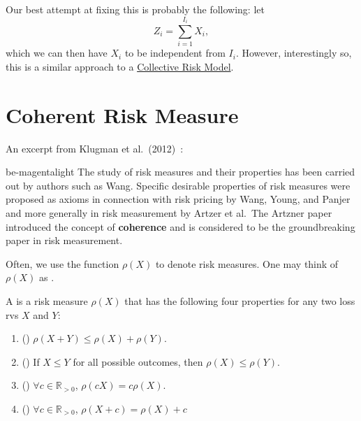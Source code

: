 \documentclass[notoc,notitlepage]{tufte-book}
\begin{document}
Our best attempt at fixing this is probably the following: let
\begin{equation*}
  Z_i = \sum_{i=1}^{I_i} X_i,
\end{equation*}
which we can then have $X_i$ to be independent from $I_i$. However, interestingly so, this is a similar approach to a \hyperref[defn:collective_risk_model]{Collective Risk Model}.


\section{Coherent Risk Measure}%
\label{sec:coherent_risk_measure}

An excerpt from Klugman et al.\ (2012)~\cite{KlugmanPanjerWillmot2012}:

\begin{quotebox}{be-magenta}{light}
  The study of risk measures and their properties has been carried out by authors such as Wang. Specific desirable properties of risk measures were proposed as axioms in connection with risk pricing by Wang, Young, and Panjer and more generally in risk measurement by Artzer et al.\ The Artzner paper introduced the concept of \textbf{coherence} and is considered to be the groundbreaking paper in risk measurement.
\end{quotebox}

Often, we use the function $\rho(X)$ to denote risk measures. One may think of $\rho(X)$ as .

\begin{defn}\label{defn:coherent_risk_measure}
  A  is a risk measure $\rho(X)$ that has the following four properties for any two loss rvs $X$ and $Y$:
  \begin{enumerate}
    \item () $\rho(X + Y) \leq \rho(X) + \rho(Y)$.
    \item () If $X \leq Y$ for all possible outcomes, then $\rho(X) \leq \rho(Y)$.
    \item () $\forall c \in \mathbb{R}_{> 0}$, $\rho(cX) = c\rho(X)$.
    \item () $\forall c \in \mathbb{R}_{> 0}$, $\rho(X + c) = \rho(X) + c$
  \end{enumerate}
\end{defn}
\end{document}
